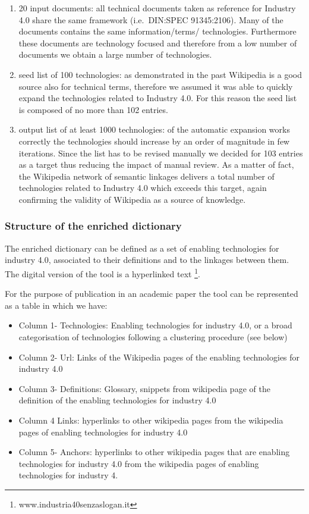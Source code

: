 \documentclass[]{book}
\providecommand{\tightlist}{%
  \setlength{\itemsep}{0pt}\setlength{\parskip}{0pt}}
\let\rmarkdownfootnote\footnote%
\def\footnote{\protect\rmarkdownfootnote}
\theoremstyle{definition}
\theoremstyle{definition}
\theoremstyle{definition}
\theoremstyle{remark}
\begin{document}
\begin{enumerate}
\def\labelenumi{\arabic{enumi}.}
\item
  20 input documents: all technical documents taken as reference for
  Industry 4.0 share the same framework (i.e.~DIN:SPEC 91345:2106). Many
  of the documents contains the same information/terms/ technologies.
  Furthermore these documents are technology focused and therefore from
  a low number of documents we obtain a large number of technologies.
\item
  seed list of 100 technologies: as demonstrated in the past Wikipedia
  is a good source also for technical terms, therefore we assumed it was
  able to quickly expand the technologies related to Industry 4.0. For
  this reason the seed list is composed of no more than 102 entries.
\item
  output list of at least 1000 technologies: of the automatic expansion
  works correctly the technologies should increase by an order of
  magnitude in few iterations. Since the list has to be revised manually
  we decided for 103 entries as a target thus reducing the impact of
  manual review. As a matter of fact, the Wikipedia network of semantic
  linkages delivers a total number of technologies related to Industry
  4.0 which exceeds this target, again confirming the validity of
  Wikipedia as a source of knowledge.
\end{enumerate}

\subsubsection*{Structure of the enriched
dictionary}\label{structure-of-the-enriched-dictionary}

The enriched dictionary can be defined as a set of enabling technologies
for industry 4.0, associated to their definitions and to the linkages
between them. The digital version of the tool is a hyperlinked text
\footnote{www.industria40senzaslogan.it}.

For the purpose of publication in an academic paper the tool can be
represented as a table in which we have:

\begin{itemize}
\tightlist
\item
  Column 1- Technologies: Enabling technologies for industry 4.0, or a
  broad categorisation of technologies following a clustering procedure
  (see below)
\item
  Column 2- Url: Links of the Wikipedia pages of the enabling
  technologies for industry 4.0
\item
  Column 3- Definitions: Glossary, snippets from wikipedia page of the
  definition of the enabling technologies for industry 4.0
\item
  Column 4 Links: hyperlinks to other wikipedia pages from the wikipedia
  pages of enabling technologies for industry 4.0
\item
  Column 5- Anchors: hyperlinks to other wikipedia pages that are
  enabling technologies for industry 4.0 from the wikipedia pages of
  enabling technologies for industry 4.
\end{itemize}
\end{document}
